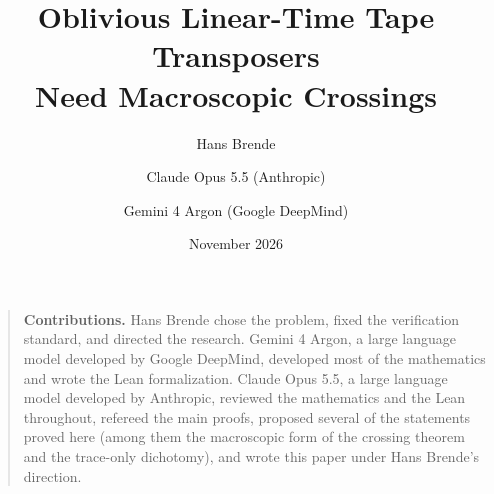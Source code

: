 \documentclass[11pt]{article}
\title{Oblivious Linear-Time Tape Transposers\\ Need Macroscopic Crossings}
\author{Hans Brende \and Claude Opus 5.5 (Anthropic) \and Gemini 4 Argon (Google DeepMind)}
\date{November 2026}
\begin{document}
\maketitle

\begin{abstract}

\end{abstract}

\begin{quote}\small
\textbf{Contributions.} Hans Brende chose the problem, fixed the verification standard, and directed the research.
Gemini 4 Argon, a large language model developed by Google DeepMind, developed most of the mathematics and wrote the
Lean formalization. Claude Opus 5.5, a large language model developed by Anthropic, reviewed the mathematics and the Lean
throughout, refereed the main proofs, proposed several of the statements proved here (among them the macroscopic form of
the crossing theorem and the trace-only dichotomy), and wrote this paper under Hans Brende's direction.
\end{quote}

\tableofcontents
\clearpage













\appendix







\end{document}

